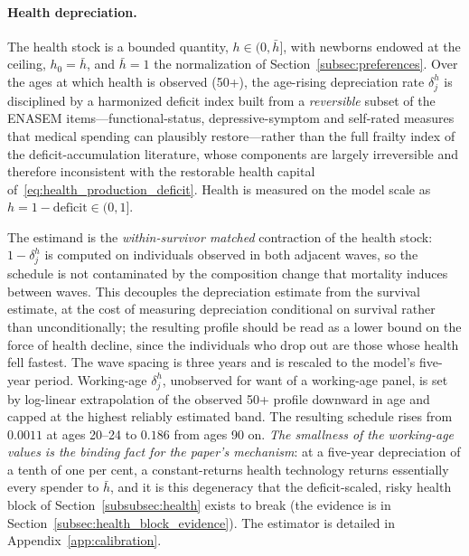 \documentclass[12pt,a4paper]{article}
\begin{document}
\paragraph{Health depreciation.}
The health stock is a bounded quantity, $h\in(0,\bar h]$, with newborns endowed at the ceiling, $h_0=\bar h$, and $\bar h=1$ the normalization of Section~\ref{subsec:preferences}. Over the ages at which health is observed (50+), the age-rising depreciation rate $\delta^h_j$ is disciplined by a harmonized deficit index built from a \emph{reversible} subset of the ENASEM items---functional-status, depressive-symptom and self-rated measures that medical spending can plausibly restore---rather than the full frailty index of the deficit-accumulation literature, whose components are largely irreversible and therefore inconsistent with the restorable health capital of~\eqref{eq:health_production_deficit}. Health is measured on the model scale as $h = 1 - \text{deficit} \in (0,1]$.

The estimand is the \emph{within-survivor matched} contraction of the health stock: $1-\delta^h_j$ is computed on individuals observed in both adjacent waves, so the schedule is not contaminated by the composition change that mortality induces between waves. This decouples the depreciation estimate from the survival estimate, at the cost of measuring depreciation conditional on survival rather than unconditionally; the resulting profile should be read as a lower bound on the force of health decline, since the individuals who drop out are those whose health fell fastest. The wave spacing is three years and is rescaled to the model's five-year period. Working-age $\delta^h_j$, unobserved for want of a working-age panel, is set by log-linear extrapolation of the observed 50+ profile downward in age and capped at the highest reliably estimated band. The resulting schedule rises from $0.0011$ at ages 20--24 to $0.186$ from ages 90 on. \emph{The smallness of the working-age values is the binding fact for the paper's mechanism}: at a five-year depreciation of a tenth of one per cent, a constant-returns health technology returns essentially every spender to $\bar h$, and it is this degeneracy that the deficit-scaled, risky health block of Section~\ref{subsubsec:health} exists to break (the evidence is in Section~\ref{subsec:health_block_evidence}). The estimator is detailed in Appendix~\ref{app:calibration}.
\end{document}
